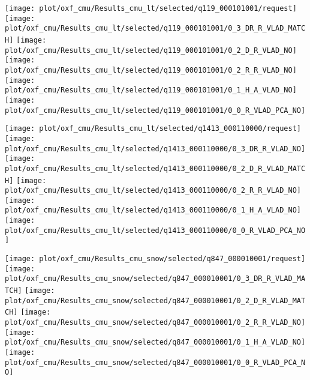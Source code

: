 \begin{figure*}
	\begin{minipage}{0.01\textwidth}
	\end{minipage}
	\begin{minipage}{0.95\textwidth}
		\center
		\texttt{[image: plot/oxf\_cmu/Results\_cmu\_lt/selected/q119\_000101001/request]}
		\texttt{[image: plot/oxf\_cmu/Results\_cmu\_lt/selected/q119\_000101001/0\_3\_DR\_R\_VLAD\_MATCH]}
		\texttt{[image: plot/oxf\_cmu/Results\_cmu\_lt/selected/q119\_000101001/0\_2\_D\_R\_VLAD\_NO]}	
		\texttt{[image: plot/oxf\_cmu/Results\_cmu\_lt/selected/q119\_000101001/0\_2\_R\_R\_VLAD\_NO]}	
		\texttt{[image: plot/oxf\_cmu/Results\_cmu\_lt/selected/q119\_000101001/0\_1\_H\_A\_VLAD\_NO]}	
		\texttt{[image: plot/oxf\_cmu/Results\_cmu\_lt/selected/q119\_000101001/0\_0\_R\_VLAD\_PCA\_NO]}
		
		\texttt{[image: plot/oxf\_cmu/Results\_cmu\_lt/selected/q1413\_000110000/request]}
		\texttt{[image: plot/oxf\_cmu/Results\_cmu\_lt/selected/q1413\_000110000/0\_3\_DR\_R\_VLAD\_NO]}
		\texttt{[image: plot/oxf\_cmu/Results\_cmu\_lt/selected/q1413\_000110000/0\_2\_D\_R\_VLAD\_MATCH]}
		\texttt{[image: plot/oxf\_cmu/Results\_cmu\_lt/selected/q1413\_000110000/0\_2\_R\_R\_VLAD\_NO]}
		\texttt{[image: plot/oxf\_cmu/Results\_cmu\_lt/selected/q1413\_000110000/0\_1\_H\_A\_VLAD\_NO]}
		\texttt{[image: plot/oxf\_cmu/Results\_cmu\_lt/selected/q1413\_000110000/0\_0\_R\_VLAD\_PCA\_NO]}
	\end{minipage}
	
	\begin{minipage}{0.01\textwidth}
	\end{minipage}
	\begin{minipage}{0.95\textwidth}
		\center
		\texttt{[image: plot/oxf\_cmu/Results\_cmu\_snow/selected/q847\_000010001/request]}
		\texttt{[image: plot/oxf\_cmu/Results\_cmu\_snow/selected/q847\_000010001/0\_3\_DR\_R\_VLAD\_MATCH]}
		\texttt{[image: plot/oxf\_cmu/Results\_cmu\_snow/selected/q847\_000010001/0\_2\_D\_R\_VLAD\_MATCH]}	
		\texttt{[image: plot/oxf\_cmu/Results\_cmu\_snow/selected/q847\_000010001/0\_2\_R\_R\_VLAD\_NO]}	
		\texttt{[image: plot/oxf\_cmu/Results\_cmu\_snow/selected/q847\_000010001/0\_1\_H\_A\_VLAD\_NO]}	
		\texttt{[image: plot/oxf\_cmu/Results\_cmu\_snow/selected/q847\_000010001/0\_0\_R\_VLAD\_PCA\_NO]}
		

\end{minipage}
\end{figure*}
